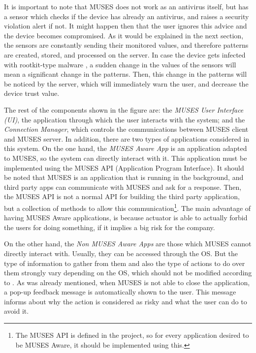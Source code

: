 It is important to note that MUSES does not work as an antivirus itself, but has a sensor which checks if the device has already an antivirus, and raises a security violation alert if not. It might happen then that the user ignores this advice and the device becomes compromised. As it would be explained in the next section, the sensors are constantly sending their monitored values, and therefore patterns are created, stored, and processed on the server. In case the device gets infected with rootkit-type malware \cite{bickford2010rootkits}, a sudden change in the values of the sensors will mean a significant change in the patterns. Then, this change in the patterns will be noticed by the server, which will immediately warn the user, and decrease the device trust value.

The rest of the components shown in the figure are: the \textit{MUSES User Interface (UI)}, the application through which the user interacts with the system; and the \textit{Connection Manager}, which controls the communications between MUSES client and MUSES server. 
In addition, there are two types of applications considered in this system. On the one hand, the \textit{MUSES Aware App} is an application adapted to MUSES, so the system can directly interact with it. This application must be implemented using the MUSES API (Application Program Interface). It should be noted that MUSES is an application that is running in the background, and third party apps can communicate with MUSES and ask for a response. Then, the MUSES API is not a normal API for building the third party application, but a collection of methods to allow this communication\footnote{The MUSES API is defined in the project, so for every application desired to be MUSES Aware, it should be implemented using this.}.
The main advantage of having MUSES Aware applications, is because actuator is able to actually forbid the users for doing something, if it implies a big risk for the company.

On the other hand, the \textit{Non MUSES Aware Apps} are those which MUSES cannot directly interact with. Usually, they can be accessed through the OS. But the type of information to gather from them and also the type of actions to do over them strongly vary depending on the OS, which should not be modified according to  \cite{Gessner13userfriendly}.
As was already mentioned, when MUSES is not able to close the application, a pop-up feedback message is automatically shown to the user. This message informs about why the action is considered as risky and what the user can do to avoid it.

